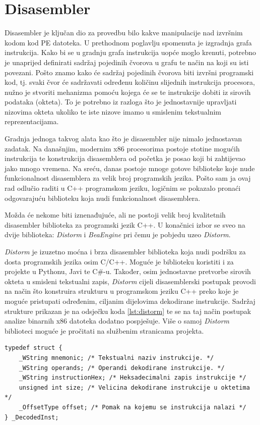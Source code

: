 \documentclass[times, utf8, diplomski, numeric]{fer}
\begin{document}
\section{Disasembler}
Disasembler je ključan dio za provedbu bilo kakve manipulacije nad izvršnim kodom kod PE datoteka. U prethodnom poglavlju spomenuta je izgradnja grafa instrukcija. Kako bi se u gradnju grafa instrukcija uopće moglo krenuti, potrebno je unaprijed definirati sadržaj pojedinih čvorova u grafu te način na koji su isti povezani. Pošto znamo kako će sadržaj pojedinih čvorova biti izvršni programski kod, tj. svaki čvor će sadržavati određenu količinu slijednih instrukcija procesora, nužno je stvoriti mehanizma pomoću kojega će se te instrukcije dobiti iz sirovih podataka (okteta). To je potrebno iz razloga što je jednostavnije upravljati nizovima okteta ukoliko te iste nizove imamo u smislenim tekstualnim reprezentacijama.

Gradnja jednoga takvog alata kao što je disasembler nije nimalo jednostavan zadatak. Na današnjim, modernim x86 procesorima postoje stotine mogućih instrukcija te konstrukcija disasemblera od početka je posao koji bi zahtijevao jako mnogo vremena. Na sreću, danas postoje mnoge gotove biblioteke koje nude funkcionalnost disasemblera za velik broj programskih jezika. Pošto sam ja ovaj rad odlučio raditi u C++ programskom jeziku, logičnim se pokazalo pronaći odgovarajuću biblioteku koja nudi funkcionalnost disasemblera.

Možda će nekome biti iznenađujuće, ali ne postoji velik broj kvalitetnih disasembler biblioteka za programski jezik C++. U konačnici izbor se sveo na dvije biblioteka: \emph{Distorm}\citep{distorm} i \emph{BeaEngine}\citep{bea_engine} pri čemu je pobjedu uzeo \emph{Distorm}.

\emph{Distorm} je izuzetno moćna i brza disasembler biblioteka koja nudi podršku za dosta programskih jezika osim C/C++. Moguće je biblioteku koristiti i za projekte u Pythonu, Javi te C\#-u. Također, osim jednostavne pretvorbe sirovih okteta u smisleni tekstualni zapis, \emph{Distorm} cijeli disasemblerski postupak provodi na način što konstruira strukturu u programskom jeziku C++ preko koje je moguće pristupati određenim, ciljanim dijelovima dekodirane instrukcije. Sadržaj strukture prikazan je na odsječku koda \ref{lst:distorm} te se na taj način postupak analize binarnih x86 datoteka dodatno pospješuje. Više o samoj \emph{Distorm} biblioteci moguće je pročitati na službenim stranicama projekta\citep{distorm}. 

\pagebreak
\begin{lstlisting}[frame=single, caption=Temeljna \emph{distorm} struktura za dekodiranu instrukciju, label={lst:distorm}]
typedef struct {
	_WString mnemonic; /* Tekstualni naziv instrukcije. */
	_WString operands; /* Operandi dekodirane instrukcije. */
	_WString instructionHex; /* Heksadecimalni zapis instrukcije */
	unsigned int size; /* Velicina dekodirane instrukcije u oktetima */
	_OffsetType offset; /* Pomak na kojemu se instrukcija nalazi */
} _DecodedInst;
\end{lstlisting}
\end{document}
